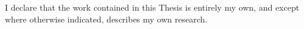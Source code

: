 I declare that the work contained in this Thesis is entirely my own, and except where otherwise indicated, 
describes my own research.